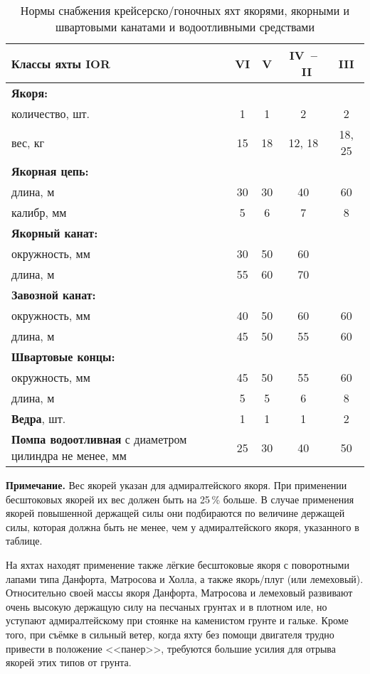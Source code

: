 \begin{table*}[htb]
  \centering{}
  \begin{tabular}{p{}|c|c|c|c}
    \toprule
    Классы яхты IOR & VI & V & IV~--~II & III \\
    \midrule
    \textbf{Якоря:} \\ 
    количество, шт. &  1 & 1 & 2 & 2 \\
    вес, кг & 15 & 18 & 12, 18 & 18, 25 \\ 
    \midrule
    \textbf{Якорная цепь:} \\
    длина, м & 30 & 30 & 40 & 60 \\
    калибр, мм & 5 & 6 & 7 & 8 \\
    \midrule
    \textbf{Якорный канат:} \\
    окружность, мм & 30 & 50 & 60 \\
    длина, м & 55 & 60 & 70 \\
    \midrule
    \textbf{Завозной канат:} \\
    окружность, мм & 40 & 50 & 60 & 60 \\
    длина, м & 45 & 50 & 55 & 60 \\
    \midrule
    \textbf{Швартовые концы:} \\
    окружность, мм & 45 & 50 & 55 & 60 \\
    длина, м & 5 & 5 & 6 & 8 \\
    \midrule
    \textbf{Ведра}, шт. & 1 & 1 & 1 & 2 \\
    \midrule
    \textbf{Помпа водоотливная} 
    с диаметром цилиндра не менее, мм & 25 & 30 & 40 & 50 \\
    \bottomrule
  \end{tabular}
  \caption{Нормы снабжения крейсерско\-/гоночных яхт якорями, якорными и швартовыми канатами и водоотливными средствами}
  \label{tab:2}
  \textbf{Примечание. }Вес якорей указан для адмиралтейского якоря. При применении бесштоковых якорей их вес должен быть на 25\,\% больше. В случае применения якорей повышенной держащей силы они подбираются по величине держащей силы, которая должна быть не менее, чем у адмиралтейского якоря, указанного в таблице.
\end{table*}

На яхтах находят применение также лёгкие бесштоковые якоря с
поворотными лапами типа Данфорта, Матросова и Холла, а также
якорь\-/плуг (или лемеховый). Относительно своей массы якоря Данфорта,
Матросова и лемеховый развивают очень высокую держащую силу на
песчаных грунтах и в плотном иле, но уступают адмиралтейскому при
стоянке на каменистом грунте и гальке. Кроме того, при съёмке в
сильный ветер, когда яхту без помощи двигателя трудно привести в
положение <<панер>>, требуются большие усилия для отрыва якорей этих
типов от грунта.

